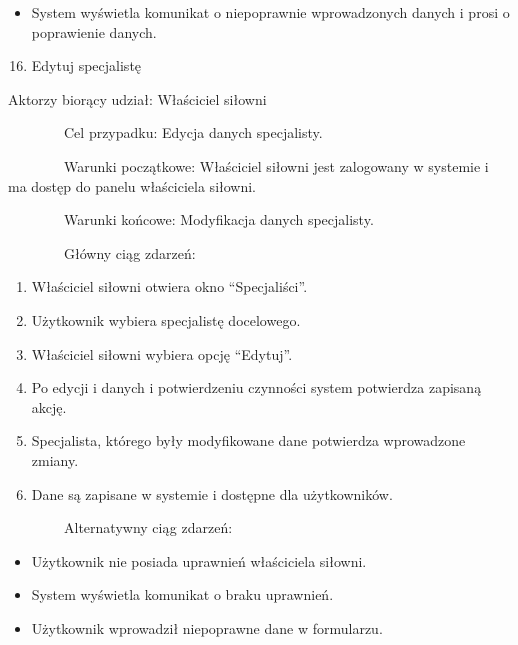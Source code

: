 \documentclass[
]{article}
\providecommand{\tightlist}{%
  \setlength{\itemsep}{0pt}\setlength{\parskip}{0pt}}
\begin{document}
\begin{itemize}
\tightlist
\item
  {System wyświetla komunikat o niepoprawnie wprowadzonych danych i
  prosi o poprawienie danych.\\
  }
\end{itemize}

\begin{enumerate}
\setcounter{enumi}{15}
\tightlist
\item
  {Edytuj specjalistę}
\end{enumerate}

{Aktorzy biorący udział: Właściciel siłowni}

{~~~~~~~~Cel przypadku: Edycja danych specjalisty.}

{~~~~~~~~Warunki początkowe: Właściciel siłowni jest zalogowany w
systemie i ma dostęp do panelu właściciela siłowni.}

{~~~~~~~~Warunki końcowe: Modyfikacja danych specjalisty.}

{~~~~~~~~Główny ciąg zdarzeń:}

\begin{enumerate}
\tightlist
\item
  {Właściciel siłowni otwiera okno ``Specjaliści''.}
\item
  {Użytkownik wybiera specjalistę docelowego.}
\item
  {Właściciel siłowni wybiera opcję ``Edytuj''.}
\item
  {Po edycji i danych i potwierdzeniu czynności system potwierdza
  zapisaną akcję.}
\item
  {Specjalista, którego były modyfikowane dane potwierdza wprowadzone
  zmiany.}
\item
  {Dane są zapisane w systemie i dostępne dla użytkowników.}
\end{enumerate}

{~~~~~~~~Alternatywny ciąg zdarzeń:}

\begin{itemize}
\tightlist
\item
  {Użytkownik nie posiada uprawnień właściciela siłowni.}
\end{itemize}

\begin{itemize}
\tightlist
\item
  {System wyświetla komunikat o braku uprawnień.}
\end{itemize}

\begin{itemize}
\tightlist
\item
  {Użytkownik wprowadził niepoprawne dane w formularzu.}
\end{itemize}
\end{document}
